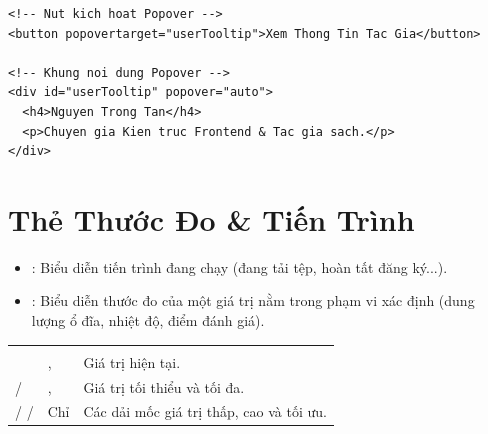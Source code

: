 \begin{codeWindow}
\begin{lstlisting}[language=HTML5]
<!-- Nut kich hoat Popover -->
<button popovertarget="userTooltip">Xem Thong Tin Tac Gia</button>

<!-- Khung noi dung Popover -->
<div id="userTooltip" popover="auto">
  <h4>Nguyen Trong Tan</h4>
  <p>Chuyen gia Kien truc Frontend & Tac gia sach.</p>
</div>
\end{lstlisting}
\end{codeWindow}

\section{Thẻ Thước Đo  \& Tiến Trình }
\label{sec:meter_progress}

\begin{conceptBox}
\begin{itemize}[leftmargin=1.5em, itemsep=2pt, parsep=0pt]
    \item {}: Biểu diễn tiến trình đang chạy (đang tải tệp, hoàn tất đăng ký...).
    \item {}: Biểu diễn thước đo của một giá trị nằm trong phạm vi xác định (dung lượng ổ đĩa, nhiệt độ, điểm đánh giá).
\end{itemize}
\end{conceptBox}

\begin{prettyTableBox}
\begin{tabularx}{\linewidth}{K{3.0cm} Z Z}
 &  &  \\
 & ,  & Giá trị hiện tại. \\
 /  & ,  & Giá trị tối thiểu và tối đa. \\
 /  /  & Chỉ  & Các dải mốc giá trị thấp, cao và tối ưu. \\
\end{tabularx}
\end{prettyTableBox}

